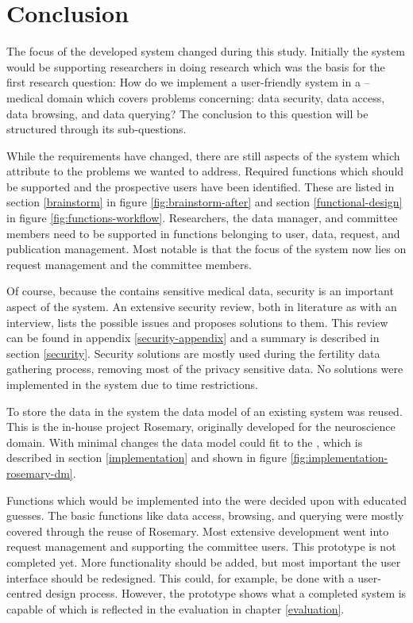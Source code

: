 \section{Conclusion}

The focus of the developed system changed during this study.
Initially the system would be supporting researchers in doing research which was the basis for the first research question:
How do we implement a user-friendly system in a \IVF{}--\PRN{} medical domain which covers problems concerning: data security, data access, data browsing, and data querying?
The conclusion to this question will be structured through its sub-questions.

While the requirements have changed, there are still aspects of the system which attribute to the problems we wanted to address.
Required functions which should be supported and the prospective users have been identified.
These are listed in section \ref{brainstorm} in figure \ref{fig:brainstorm-after} and section \ref{functional-design} in figure \ref{fig:functions-workflow}.
Researchers, the data manager, and committee members need to be supported in functions belonging to user, data, request, and publication management.
Most notable is that the focus of the system now lies on request management and the committee members.

Of course, because the \projectdata{} contains sensitive medical data, security is an important aspect of the system.
An extensive security review, both in literature as with an interview, lists the possible issues and proposes solutions to them.
This review can be found in appendix \ref{security-appendix} and a summary is described in section \ref{security}.
Security solutions are mostly used during the fertility data gathering process, removing most of the privacy sensitive data.
No solutions were implemented in the system due to time restrictions.

To store the data in the system the data model of an existing system was reused.
This is the in-house project Rosemary, originally   developed for the neuroscience domain.
With minimal changes the data model could fit to the \projectdata{}, which is described in section \ref{implementation} and shown in figure \ref{fig:implementation-rosemary-dm}.

Functions which would be implemented into the \ivfprototype{} were decided upon with educated guesses.
The basic functions like data access, browsing, and querying were mostly covered through the reuse of Rosemary.
Most extensive development went into request management and supporting the committee users.
This prototype is not completed yet.
More functionality should be added, but most important the user interface should be redesigned.
This could, for example, be done with a user-centred design process.
However, the prototype shows what a completed system is capable of which is reflected in the evaluation in chapter \ref{evaluation}.

